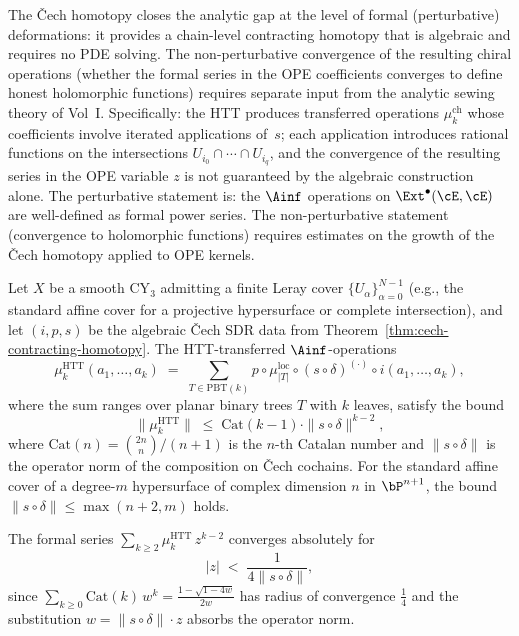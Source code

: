 \begin{remark}
\label{rem:cech-perturbative-scope}
The \v{C}ech homotopy closes the analytic gap at the level of formal
(perturbative) deformations: it provides a chain-level contracting
homotopy that is algebraic and requires no PDE solving. The
non-perturbative convergence of the resulting chiral operations
(whether the formal series in the OPE coefficients converges to
define honest holomorphic functions) requires separate input from
the analytic sewing theory of Vol~I. Specifically: the HTT
produces transferred operations $\mu_k^{\mathrm{ch}}$ whose
coefficients involve iterated applications of~$s$; each application
introduces rational functions on the intersections $U_{i_0} \cap
\cdots \cap U_{i_q}$, and the convergence of the resulting series
in the OPE variable $z$ is not guaranteed by the algebraic
construction alone. The perturbative statement is: the $\Ainf$
operations on $\Ext^\bullet(\cE, \cE)$ are well-defined as formal
power series. The non-perturbative statement (convergence to
holomorphic functions) requires estimates on the growth of the
\v{C}ech homotopy applied to OPE kernels.
\end{remark}


\begin{proposition}
\label{prop:cech-htt-coefficient-convergence}
Let $X$ be a smooth CY$_3$ admitting a finite Leray cover $\{U_\alpha\}_{\alpha=0}^{N-1}$ \textup{(}e.g., the standard affine cover for a projective hypersurface or complete intersection\textup{)}, and let $(i, p, s)$ be the algebraic \v{C}ech SDR data from Theorem~\textup{\ref{thm:cech-contracting-homotopy}}. The HTT-transferred $\Ainf$-operations
\[
 \mu_k^{\mathrm{HTT}}(a_1, \ldots, a_k) \;=\; \sum_{T \in \mathrm{PBT}(k)} p \circ \mu_{|T|}^{\mathrm{loc}} \circ (s \circ \delta)^{(\cdot)} \circ i(a_1, \ldots, a_k),
\]
where the sum ranges over planar binary trees $T$ with $k$ leaves, satisfy the bound
\begin{equation}
\label{eq:cech-htt-bound}
 \bigl\| \mu_k^{\mathrm{HTT}} \bigr\| \;\leq\; \mathrm{Cat}(k-1) \cdot \| s \circ \delta \|^{k-2},
\end{equation}
where $\mathrm{Cat}(n) = \binom{2n}{n}/(n+1)$ is the $n$-th Catalan number and $\|s \circ \delta\|$ is the operator norm of the composition on \v{C}ech cochains. For the standard affine cover of a degree-\(m\) hypersurface of complex dimension \(n\) in \(\bP^{n+1}\), the bound \(\|s\circ\delta\|\leq \max(n+2,m)\) holds.

The formal series $\sum_{k \geq 2} \mu_k^{\mathrm{HTT}} \, z^{k-2}$ converges absolutely for
\[
 |z| \;<\; \frac{1}{4 \| s \circ \delta \|},
\]
since $\sum_{k \geq 0} \mathrm{Cat}(k) \, w^k = \frac{1 - \sqrt{1 - 4w}}{2w}$ has radius of convergence $\frac{1}{4}$ and the substitution $w = \|s \circ \delta\| \cdot z$ absorbs the operator norm.
\end{proposition}


